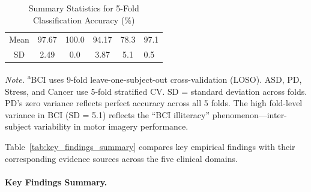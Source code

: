 {\tablestripes\tablefontsize
\begin{xltabular}{\textwidth}{@{} C C C C C L @{}}
\caption[Summary Statistics for 5-Fold Classification Accuracy (\%)]{Summary Statistics for 5-Fold Classification Accuracy (\%)}\label{tab:fold_level_performance_2} \\
\toprule
{} &  &  &  &  &  \\
\midrule
\endfirsthead
\endhead
\bottomrule
\endlastfoot
Mean & 97.67 & 100.0 & 94.17 & 78.3 & 97.1 \\
SD   & 2.49  & 0.0  & 3.87  & 5.1  & 0.5 \\
\end{xltabular}}
\vspace{0.5em}\noindent\textit{Note.} \textsuperscript{a}BCI uses 9-fold leave-one-subject-out cross-validation (LOSO). ASD, PD, Stress, and Cancer use 5-fold stratified CV. SD = standard deviation across folds. PD's zero variance reflects perfect accuracy across all 5 folds. The high fold-level variance in BCI (SD = 5.1) reflects the ``BCI illiteracy'' phenomenon---inter-subject variability in motor imagery performance.
\fi %

Table~\ref{tab:key_findings_summary} compares key empirical findings with their corresponding evidence sources across the five clinical domains.

\paragraph{Key Findings Summary.}


